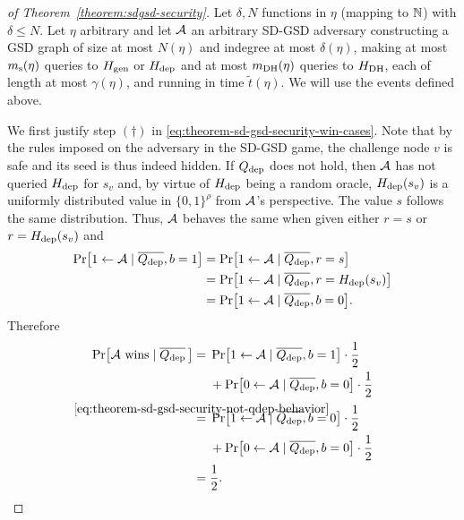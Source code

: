 \begin{proof}[of Theorem~\ref{theorem:sdgsd-security}]
	Let $\delta, N$ functions in $\eta$ (mapping to $\mathbb{N}$) with $\delta \le N$.
	Let $\eta$ arbitrary and let $\mathcal{A}$ an arbitrary SD-GSD adversary constructing a GSD graph of size at most $N(\eta)$ and indegree at most $\delta(\eta)$, making at most $m_\mathrm{s}(\eta)$ queries to $H_\mathrm{gen}$ or $H_\mathrm{dep}$ and at most $m_\mathrm{DH}(\eta)$ queries to $H_\mathrm{DH}$, each of length at most $\gamma(\eta)$, and running in time $\tilde{t}(\eta)$. We will use the events defined above.

	We first justify step $(\dagger)$ in \eqref{eq:theorem-sd-gsd-security-win-cases}. Note that by the rules imposed on the adversary in the SD-GSD game, the challenge node $v$ is safe and its seed is thus indeed hidden. If $Q_\mathrm{dep}$ does not hold, then $\mathcal{A}$ has not queried $H_\mathrm{dep}$ for $s_v$ and, by virtue of $H_\mathrm{dep}$ being a random oracle, $H_\mathrm{dep}(s_v)$ is a uniformly distributed value in $\{0, 1\}^\rho$ from $\mathcal{A}$'s perspective. The value $s$ follows the same distribution. Thus, $\mathcal{A}$ behaves the same when given either $r = s$ or $r = H_\mathrm{dep}(s_v)$ and
	\begin{align} \label{eq:theorem-sd-gsd-security-not-qdep-behavior}
		\begin{split}
			\pr{1 \from \adv \mid \overline{\qdep}, b = 1} & = \pr{1 \from \adv \mid \overline{\qdep}, r = s}          \\
			& = \pr{1 \from \adv \mid \overline{\qdep}, r = \hdep(s_v)} \\
			& = \pr{1 \from \adv \mid \overline{\qdep}, b = 0}.
		\end{split}
	\end{align}
	Therefore
	\begin{align*}
		\pr{\wins \mid \overline{\qdep} \,} & = \begin{aligned}[t]
			                                         & \pr{1 \from \adv \mid \overline{\qdep}, b = 1} \cdot \frac{1}{2}   \\
			                                         & + \pr{0 \from \adv \mid \overline{\qdep}, b = 0} \cdot \frac{1}{2}
		                                        \end{aligned}                                                                              \\
		                                    & \stackrel{\mathclap{\eqref{eq:theorem-sd-gsd-security-not-qdep-behavior}}}{=} \begin{aligned}[t]
			                                                                                                                     & \pr{1 \from \adv \mid \overline{\qdep}, b = 0} \cdot \frac{1}{2}   \\
			                                                                                                                     & + \pr{0 \from \adv \mid \overline{\qdep}, b = 0} \cdot \frac{1}{2}
		                                                                                                                    \end{aligned} \\
		                                    & = \frac{1}{2}.
	\end{align*}


\end{proof}
